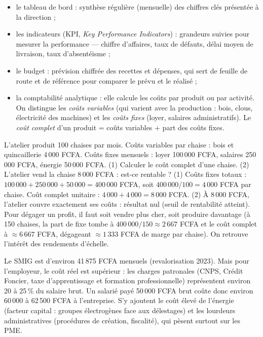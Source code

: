 \documentclass[11pt]{article}
\newcommand{\cle}[1]{{\popxbold\color{popdark}#1}}
\begin{document}
\begin{itemize}
\item le \cle{tableau de bord} : synthèse régulière (mensuelle) des chiffres clés présentée à la direction ;
\item les \cle{indicateurs} (KPI, \emph{Key Performance Indicators}) : grandeurs suivies pour mesurer la performance — chiffre d'affaires, taux de défauts, délai moyen de livraison, taux d'absentéisme ;
\item le \cle{budget} : prévision chiffrée des recettes et dépenses, qui sert de feuille de route et de référence pour comparer le prévu et le réalisé ;
\item la \cle{comptabilité analytique} : elle calcule les coûts par produit ou par activité. On distingue les \emph{coûts variables} (qui varient avec la production : bois, clous, électricité des machines) et les \emph{coûts fixes} (loyer, salaires administratifs). Le \emph{coût complet} d'un produit = coûts variables + part des coûts fixes.
\end{itemize}

\begin{exoresolu}
L'atelier produit 100 chaises par mois. Coûts variables par chaise : bois et quincaillerie 4\,000 FCFA. Coûts fixes mensuels : loyer 100\,000 FCFA, salaires 250\,000 FCFA, énergie 50\,000 FCFA. (1) Calculer le coût complet d'une chaise. (2) L'atelier vend la chaise 8\,000 FCFA : est-ce rentable ?
\tcblower
(1) Coûts fixes totaux : $100\,000 + 250\,000 + 50\,000 = 400\,000$ FCFA, soit $400\,000 / 100 = 4\,000$ FCFA par chaise.
Coût complet unitaire : $4\,000 + 4\,000 = 8\,000$ FCFA.
(2) À 8\,000 FCFA, l'atelier couvre exactement ses coûts : résultat nul (seuil de rentabilité atteint). Pour dégager un profit, il faut soit vendre plus cher, soit produire davantage (à 150 chaises, la part de fixe tombe à $400\,000/150 \approx 2\,667$ FCFA et le coût complet à $\approx 6\,667$ FCFA, dégageant $\approx 1\,333$ FCFA de marge par chaise). On retrouve l'intérêt des rendements d'échelle.
\end{exoresolu}

\begin{exemplebox}
Le SMIG est d'environ 41\,875 FCFA mensuels (revalorisation 2023). Mais pour l'employeur, le coût réel est supérieur : les charges patronales (CNPS, Crédit Foncier, taxe d'apprentissage et formation professionnelle) représentent environ 20 à 25\,\% du salaire brut. Un salarié payé 50\,000 FCFA brut coûte donc environ 60\,000 à 62\,500 FCFA à l'entreprise. S'y ajoutent le coût élevé de l'énergie (facteur capital : groupes électrogènes face aux délestages) et les lourdeurs administratives (procédures de création, fiscalité), qui pèsent surtout sur les PME.
\end{exemplebox}
\end{document}
